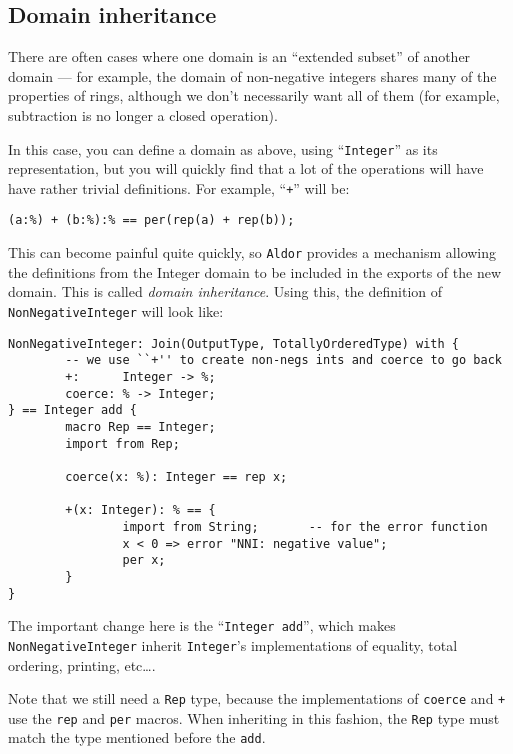 \documentclass{article}
\newcommand{\Aldor}{{\tt Aldor}}
\begin{document}
\subsection{Domain inheritance}

There are often cases where one domain is an ``extended subset'' of
another domain --- for example, the domain of non-negative integers
shares many of the properties of rings, although we don't necessarily
want all of them (for example, subtraction is no longer a closed
operation).


In this case, you can define a domain as above, using
``{\tt Integer}''
as its representation, but you will quickly find that a lot
of the operations will have have rather trivial definitions.  For
example, ``{\tt +}'' will be:
\begin{small}
\begin{verbatim}
(a:%) + (b:%):% == per(rep(a) + rep(b));
\end{verbatim}
\end{small}
This can become painful quite quickly, so \Aldor{} provides a
mechanism allowing the definitions from the Integer domain to be
included in the exports of the new domain.  This is called {\em domain
inheritance}.  Using this, the definition of {\tt
Non\-Neg\-ative\-Int\-eger} will look like:
\begin{small}
\begin{verbatim}
NonNegativeInteger: Join(OutputType, TotallyOrderedType) with {
        -- we use ``+'' to create non-negs ints and coerce to go back
        +:      Integer -> %;
        coerce: % -> Integer;
} == Integer add {
        macro Rep == Integer;
        import from Rep;

        coerce(x: %): Integer == rep x;

        +(x: Integer): % == {
                import from String;       -- for the error function
                x < 0 => error "NNI: negative value";
                per x;
        }
}
\end{verbatim}
\end{small}

The important change here is the ``{\tt Integer add}'', which makes
{\tt Non\-Negative\-Integer} inherit {\tt Integer}'s implementations of
equality, total ordering, printing, etc\dots.

Note that we still need a {\tt Rep} type, because the implementations of
{\tt coerce} and {\tt +} use the {\tt rep} and {\tt per} macros.
When inheriting in this fashion, the {\tt Rep} type must match the type
mentioned before the {\tt add}.
\end{document}

